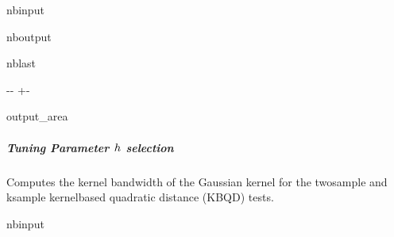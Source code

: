 \documentclass[letterpaper,10pt,english,openany,oneside]{sphinxmanual}
\begin{document}
{{{{\begin{sphinxuseclass}{nbinput}
\end{sphinxuseclass}
\begin{sphinxuseclass}{nboutput}
\begin{sphinxuseclass}{nblast}
{

\kern-\sphinxverbatimsmallskipamount\kern-\baselineskip
\kern+\FrameHeightAdjust\kern-\fboxrule
\vspace{\nbsphinxcodecellspacing}

\begin{sphinxuseclass}{output_area}
\begin{sphinxuseclass}{}


\begin{sphinxVerbatim}[commandchars=\\\{\}]
[0.46827108 0.05479605 0.21163936 0.06195099 0.39567698 0.40473724
 0.26561508 0.36791766 0.09324676 0.46847274]
\end{sphinxVerbatim}



\end{sphinxuseclass}
\end{sphinxuseclass}
}

\end{sphinxuseclass}
\end{sphinxuseclass}

\subparagraph{Tuning Parameter \protect\(h\protect\) selection}
\label{\detokenize{user_guide/basic_usage:Tuning-Parameter-h-selection}}
\sphinxAtStartPar
Computes the kernel bandwidth of the Gaussian kernel for the two\sphinxhyphen{}sample and ksample kernel\sphinxhyphen{}based quadratic distance (KBQD) tests.

\begin{sphinxuseclass}{nbinput}
{
\begin{sphinxVerbatim}[commandchars=\\\{\}]
\llap{\color{nbsphinxin}[17]:\,\hspace{\fboxrule}\hspace{\fboxsep}}   

   
    


\end{sphinxVerbatim}}
\end{sphinxuseclass}}}}}
\end{document}
